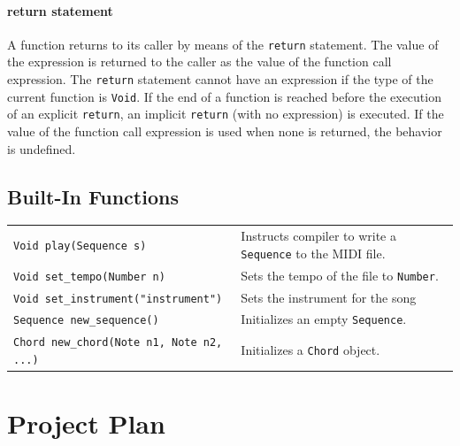 \documentclass[12pt,A4]{book}
\begin{document}
\subsubsection{return statement}
A function returns to its caller by means of the \verb|return| statement. The value of the expression is returned to the caller as the value of the function call expression. The \verb|return| statement cannot have an expression if the type of the current function is \verb|Void|.
If the end of a function is reached before the execution of an explicit \verb|return|, an implicit \verb|return| (with no expression) is executed. If the value of the function call expression is used when none is returned, the behavior is undefined.

\section{Built-In Functions}

\begin{tabular}{l p{}}
\verb|Void play(Sequence s)| & Instructs compiler to write a \verb|Sequence| to the MIDI file.\\
\verb|Void set_tempo(Number n)| & Sets the tempo of the file to \verb|Number|.\\
\verb|Void set_instrument("instrument")| & Sets the instrument for the song\\
\verb|Sequence new_sequence()| & Initializes an empty \verb|Sequence|.\\
\verb|Chord new_chord(Note n1, Note n2, ...)| & Initializes a \verb|Chord| object.\\
\end{tabular}

\chapter{Project Plan}
\end{document}
